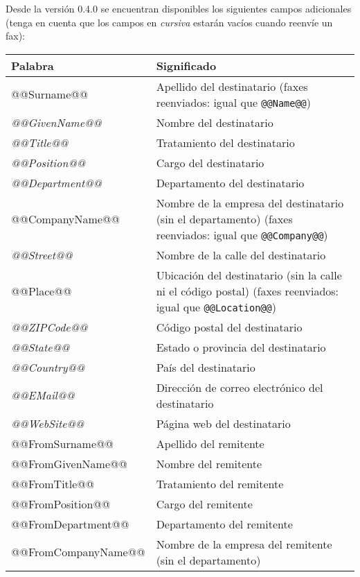 \documentclass[a4paper,10pt]{scrartcl}
\begin{document}
Desde la versión 0.4.0 se encuentran disponibles los siguientes campos adicionales (tenga en cuenta que los campos en \textit{cursiva} estarán vacíos cuando reenvíe un fax):
\begin{center}
\begin{tabular}{|l|p{}|}
\hline
\bfseries Palabra & \bfseries Significado \\
\hline\hline
\ttfamily @@Surname@@ & Apellido del destinatario (faxes reenviados: igual que \texttt{@@Name@@}) \\\hline
\ttfamily\itshape @@GivenName@@ & Nombre del destinatario \\\hline
\ttfamily\itshape @@Title@@ & Tratamiento del destinatario \\\hline
\ttfamily\itshape @@Position@@ & Cargo del destinatario \\\hline
\ttfamily\itshape @@Department@@ & Departamento del destinatario\\\hline
\ttfamily @@CompanyName@@ & Nombre de la empresa del destinatario (sin el departamento) (faxes reenviados: igual que \texttt{@@Company@@})\\\hline
\ttfamily\itshape @@Street@@ & Nombre de la calle del destinatario \\\hline
\ttfamily @@Place@@ & Ubicación del destinatario (sin la calle ni el código postal) (faxes reenviados: igual que \texttt{@@Location@@})\\\hline
\ttfamily\itshape @@ZIPCode@@ & Código postal del destinatario \\\hline
\ttfamily\itshape @@State@@ & Estado o provincia del destinatario\\\hline
\ttfamily\itshape @@Country@@ & País del destinatario\\\hline
\ttfamily\itshape @@EMail@@ & Dirección de correo electrónico del destinatario\\\hline
\ttfamily\itshape @@WebSite@@ & Página web del destinatario\\\hline\hline
\ttfamily @@FromSurname@@ & Apellido del remitente \\\hline
\ttfamily @@FromGivenName@@ & Nombre del remitente \\\hline
\ttfamily @@FromTitle@@ & Tratamiento del remitente \\\hline
\ttfamily @@FromPosition@@ & Cargo del remitente \\\hline
\ttfamily @@FromDepartment@@ & Departamento del remitente\\\hline
\ttfamily @@FromCompanyName@@ & Nombre de la empresa del remitente (sin el departamento)\\\hline

\end{tabular}
\end{center}
\end{document}
